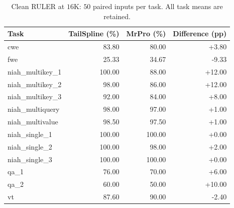 \begin{table}[ht]
\centering\small
\caption{Clean RULER at $16$K: $50$ paired inputs per task. All task means are retained.}
\label{tab:clean16k-full13}
\begin{tabular}{@{}lrrr@{}}
\toprule
Task & TailSpline (\%) & MrPro (\%) & Difference (pp) \\
\midrule
cwe & 83.80 & 80.00 & +3.80 \\
fwe & 25.33 & 34.67 & -9.33 \\
niah\_multikey\_1 & 100.00 & 88.00 & +12.00 \\
niah\_multikey\_2 & 98.00 & 86.00 & +12.00 \\
niah\_multikey\_3 & 92.00 & 84.00 & +8.00 \\
niah\_multiquery & 98.00 & 97.00 & +1.00 \\
niah\_multivalue & 98.50 & 97.50 & +1.00 \\
niah\_single\_1 & 100.00 & 100.00 & +0.00 \\
niah\_single\_2 & 100.00 & 98.00 & +2.00 \\
niah\_single\_3 & 100.00 & 100.00 & +0.00 \\
qa\_1 & 76.00 & 70.00 & +6.00 \\
qa\_2 & 60.00 & 50.00 & +10.00 \\
vt & 87.60 & 90.00 & -2.40 \\
\bottomrule
\end{tabular}
\end{table}
